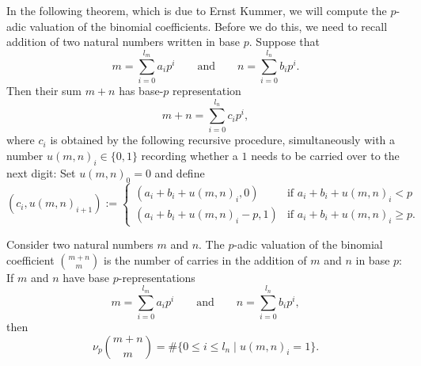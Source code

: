 In the following theorem, which is due to Ernst Kummer, we will compute the $p$-adic valuation of the binomial coefficients. Before we do this, we need to recall addition of two natural numbers written in base $p$. Suppose that
\begin{equation*}
  m=\sum_{i=0}^{l_m}a_ip^i\qquad\text{and}\qquad n=\sum_{i=0}^{l_{n}}b_ip^i.
\end{equation*}
Then their sum $m+n$ has base-$p$ representation
\begin{equation*}
  m+n=\sum_{i=0}^{l_n}c_ip^i,
\end{equation*}
where $c_i$ is obtained by the following recursive procedure, simultaneously with a number $u(m,n)_i\in\{0,1\}$ recording whether a $1$ needs to be carried over to the next digit: Set $u(m,n)_0=0$ and define
\begin{equation*}
  (c_i,u(m,n)_{i+1}) :=
  \begin{cases}
    (a_i+b_i+u(m,n)_i,0) & \text{if }a_i+b_i+u(m,n)_i< p \\
    (a_i+b_i+u(m,n)_i-p,1) & \text{if }a_i+b_i+u(m,n)_i\geq p.
  \end{cases}
\end{equation*}

\begin{theorem}\label{theorem:kummers-theorem}
  Consider two natural numbers $m$ and $n$. The $p$-adic valuation of the binomial coefficient $\binom{m+n}{m}$ is the number of carries in the addition of $m$ and $n$ in base $p$: If $m$ and $n$ have base $p$-representations
  \begin{equation*}
    m = \sum_{i=0}^{l_m}a_ip^i\qquad\text{and}\qquad n = \sum_{i=0}^{l_n}b_ip^i,
  \end{equation*}
  then
  \begin{equation*}
    \nu_p\binom{m+n}{m} = \#\{0\leq i \leq l_n \mid u(m,n)_i=1\}.
  \end{equation*}
\end{theorem}

